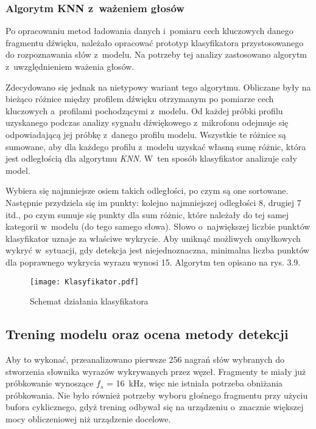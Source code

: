 \subsubsection{Algorytm KNN z~ważeniem głosów}

Po opracowaniu metod ładowania danych i~pomiaru cech kluczowych danego fragmentu dźwięku, należało opracować prototyp klasyfikatora przystosowanego do rozpoznawania słów z~modelu. Na potrzeby tej analizy zastosowano algorytm z~uwzględnieniem ważenia głosów.

Zdecydowano się jednak na nietypowy wariant tego algorytmu. Obliczane były na bieżąco różnice między profilem dźwięku otrzymanym po pomiarze cech kluczowych a~profilami pochodzącymi z~modelu. Od każdej próbki profilu uzyskanego podczas analizy sygnału dźwiękowego z~mikrofonu odejmuje się odpowiadającą jej próbkę z~danego profilu modelu. Wszystkie te różnice są sumowane, aby dla każdego profilu z~modelu uzyskać własną sumę różnic, która jest odległością dla algorytmu \textit{KNN}. W~ten sposób klasyfikator analizuje cały model.

Wybiera się najmniejsze osiem takich odległości, po czym są one sortowane. Następnie przydziela się im punkty: kolejno najmniejszej odległości 8, drugiej 7 itd., po czym sumuje się punkty dla sum różnic, które należały do tej samej kategorii w~modelu (do tego samego słowa). Słowo o~największej liczbie punktów klasyfikator uznaje za właściwe wykrycie. Aby uniknąć możliwych omyłkowych wykryć w~sytuacji, gdy detekcja jest niejednoznaczna, minimalna liczba punktów dla poprawnego wykrycia wyrazu wynosi 15. Algorytm ten opisano na rys. 3.9.

\begin{figure}[h]
	\centering
	\texttt{[image: Klasyfikator.pdf]}
	\caption{Schemat działania klasyfikatora}
\end{figure}

\FloatBarrier %
\subsection{Trening modelu oraz ocena metody detekcji}


Aby to wykonać, przeanalizowano pierwsze 256 nagrań słów wybranych do stworzenia słownika wyrazów wykrywanych przez węzeł. Fragmenty te miały już próbkowanie wynoszące 
$f_s$ = 16~kHz, więc nie istniała potrzeba obniżania próbkowania. Nie było również potrzeby wyboru głośnego fragmentu przy użyciu bufora cyklicznego, gdyż trening odbywał się na urządzeniu o~znacznie większej mocy obliczeniowej niż urządzenie docelowe.

